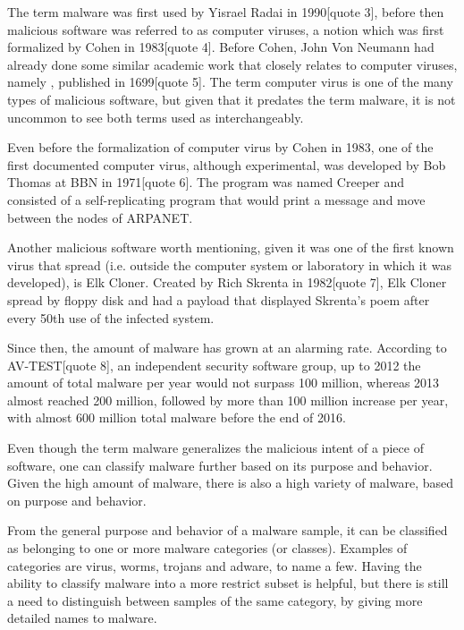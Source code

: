\documentclass{llncs}
\begin{document}

The term malware was first used by Yisrael Radai in 1990[quote 3], before then malicious software was referred to as computer viruses, a notion which was first formalized by Cohen in 1983[quote 4]. Before Cohen, John Von Neumann had already done some similar academic work that closely relates to computer viruses, namely , published in 1699[quote 5]. The term computer virus is one of the many types of malicious software, but given that it predates the term malware, it is not uncommon to see both terms used as interchangeably.

Even before the formalization of computer virus by Cohen in 1983, one of the first documented computer virus, although experimental, was developed by Bob Thomas at BBN in 1971[quote 6]. The program was named Creeper and consisted of a self-replicating program that would print a message and move between the nodes of ARPANET.

Another malicious software worth mentioning, given it was one of the first known virus that spread  (i.e. outside the computer system or laboratory in which it was developed), is Elk Cloner. Created by Rich Skrenta in 1982[quote 7], Elk Cloner spread by floppy disk and had a payload that displayed Skrenta's poem after every 50th use of the infected system.


Since then, the amount of malware has grown at an alarming rate. According to AV-TEST[quote 8], an independent security software group, up to 2012 the amount of total malware per year would not surpass 100 million, whereas 2013 almost reached 200 million, followed by more than 100 million increase per year, with almost 600 million total malware before the end of 2016.


Even though the term malware generalizes the malicious intent of a piece of software, one can classify malware further based on its purpose and behavior. Given the high amount of malware, there is also a high variety of malware, based on purpose and behavior.

From the general purpose and behavior of a malware sample, it can be classified as belonging to one or more malware categories (or classes). Examples of categories are virus, worms, trojans and adware, to name a few. Having the ability to classify malware into a more restrict subset is helpful, but there is still a need to distinguish between samples of the same category, by giving more detailed names to malware.
\end{document}
